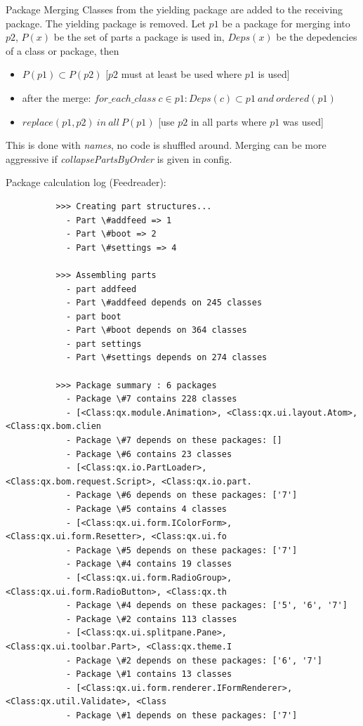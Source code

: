 \documentclass[final]{beamer}
\newlength{\onecolwid}
\begin{document}
\begin{frame}[t]
\begin{columns}[t]
\begin{column}{\onecolwid}
      \begin{block}{Package Merging}
        Classes from the yielding package are added to the receiving package.
        The yielding package is removed. 
        Let $p1$ be a package for merging into $p2$, $P(x)$ be
        the set of parts a package is used in, $Deps(x)$ be the depedencies of
        a class or package, then
        \begin{itemize}
          \item $P(p1) \subset P(p2)$  [$p2$ must at least be used where $p1$ is
            used]
          \item after the merge: $for\_each\_class\ c \in p1: Deps(c) \subset p1\ and\ 
            ordered(p1)$
          \item $replace(p1, p2)\ in\ all\ P(p1)$ [use $p2$ in all parts where $p1$ was
            used]
        \end{itemize}
        This is done with \textit{names}, no code is shuffled around.
        Merging can be more aggressive if \textit{collapsePartsByOrder} is given
        in config.

        Package calculation log (Feedreader):

        \begin{verbatim}
          >>> Creating part structures...
            - Part \#addfeed => 1
            - Part \#boot => 2
            - Part \#settings => 4

          >>> Assembling parts
            - part addfeed  
            - Part \#addfeed depends on 245 classes
            - part boot  
            - Part \#boot depends on 364 classes
            - part settings  
            - Part \#settings depends on 274 classes

          >>> Package summary : 6 packages
            - Package \#7 contains 228 classes
            - [<Class:qx.module.Animation>, <Class:qx.ui.layout.Atom>, <Class:qx.bom.clien
            - Package \#7 depends on these packages: []
            - Package \#6 contains 23 classes
            - [<Class:qx.io.PartLoader>, <Class:qx.bom.request.Script>, <Class:qx.io.part.
            - Package \#6 depends on these packages: ['7']
            - Package \#5 contains 4 classes
            - [<Class:qx.ui.form.IColorForm>, <Class:qx.ui.form.Resetter>, <Class:qx.ui.fo
            - Package \#5 depends on these packages: ['7']
            - Package \#4 contains 19 classes
            - [<Class:qx.ui.form.RadioGroup>, <Class:qx.ui.form.RadioButton>, <Class:qx.th
            - Package \#4 depends on these packages: ['5', '6', '7']
            - Package \#2 contains 113 classes
            - [<Class:qx.ui.splitpane.Pane>, <Class:qx.ui.toolbar.Part>, <Class:qx.theme.I
            - Package \#2 depends on these packages: ['6', '7']
            - Package \#1 contains 13 classes
            - [<Class:qx.ui.form.renderer.IFormRenderer>, <Class:qx.util.Validate>, <Class
            - Package \#1 depends on these packages: ['7']


\end{verbatim}
\end{block}
\end{column}
\end{columns}
\end{frame}
\end{document}
